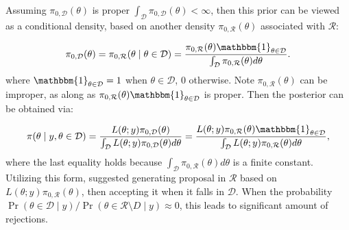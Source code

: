 \documentclass[10pt]{article}
\newcommand{\mc}[1]{\mathcal{#1}}
\begin{document}
Assuming $\pi_{0,\mc D}(\theta)$ is proper $\int_{\mc D} \pi_{0,\mc D}(\theta) <\infty$, then this prior can be viewed as a conditional density, based on another density $\pi_{0,\mc R}(\theta)$ associated with $\mc R$:

\begin{equation}
\begin{aligned}
\pi_{0,\mc D}(\theta)= \pi_{0,\mc R}(\theta \mid \theta \in \mc D) = \frac{ \pi_{0,\mc R}(\theta) \mathbbm{1}_{\theta\in \mc D} }{ \int_{\mc D}  \pi_{0,\mc R}(\theta) d\theta}.
\end{aligned}
\end{equation}
where $\mathbbm{1}_{\theta \in \mc D}=1$ when $\theta \in \mc D$, $0$ otherwise. Note $\pi_{0,\mc R}(\theta)$ can be improper, as along as $\pi_{0,\mc R}(\theta) \mathbbm{1}_{\theta\in \mc D}$ is proper. Then the posterior can be obtained via:

\begin{equation}
\begin{aligned}
\label{exact_posterior}
\pi(\theta \mid y, \theta \in \mc D) = \frac{ L(\theta;y)\pi_{0,\mc D}(\theta)}{\int_{\mc D} L(\theta;y)\pi_{0,\mc D}(\theta) d\theta } = \frac{ L(\theta;y)\pi_{0,\mc R}(\theta) \mathbbm{1}_{\theta\in \mc D} }{\int_{\mc D} L(\theta;y)\pi_{0,\mc R}(\theta) d\theta },
\end{aligned}
\end{equation}
where the last equality holds because $\int_{\mc D}  \pi_{0,\mc R}(\theta) d\theta$ is a finite constant. Utilizing this form, \cite{gelfand1992bayesian} suggested generating proposal in $\mc R$ based on $L(\theta;y)\pi_{0,\mc R}(\theta)$, then accepting it when it falls in $\mc D$. When the probability $\Pr(\theta\in \mc D \mid y) / \Pr(\theta\in \mc R \setminus D \mid y) \approx 0$, this leads to significant amount of rejections.

\end{document}
